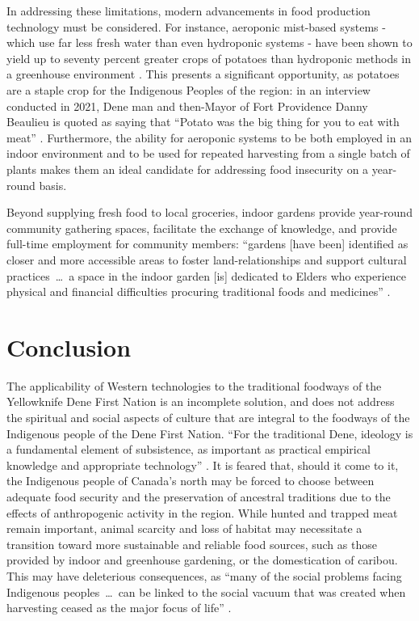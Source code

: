 \documentclass{report}
\begin{document}
\hspace{24pt} In addressing these limitations, modern advancements in food production technology must be considered. For instance, aeroponic mist-based systems - which use far less fresh water than even hydroponic systems - have been shown to yield up to seventy percent greater crops of potatoes than hydroponic methods in a greenhouse environment \parencite{aeroponicpotatoes}. This presents a significant opportunity, as potatoes are a staple crop for the Indigenous Peoples of the region: in an interview conducted in 2021, Dene man and then-Mayor of Fort Providence Danny Beaulieu is quoted as saying that ``Potato was the big thing for you to eat with meat'' \parencite[91]{resilientcommunities}. Furthermore, the ability for aeroponic systems to be both employed in an indoor environment and to be used for repeated harvesting from a single batch of plants makes them an ideal candidate for addressing food insecurity on a year-round basis.

\hspace{24pt} Beyond supplying fresh food to local groceries, indoor gardens provide year-round community gathering spaces, facilitate the exchange of knowledge, and provide full-time employment for community members: ``gardens [have been] identified as closer and more accessible areas to foster land-relationships and support cultural practices~\ldots~a space in the indoor garden [is] dedicated to Elders who experience physical and financial difficulties procuring traditional foods and medicines'' \parencite[99]{resilientcommunities}. 


\section{Conclusion}

\hspace{24pt} The applicability of Western technologies to the traditional foodways of the Yellowknife Dene First Nation is an incomplete solution, and does not address the spiritual and social aspects of culture that are integral to the foodways of the Indigenous people of the Dene First Nation.
``For the traditional Dene, ideology is a fundamental element of subsistence, as important as practical empirical knowledge and appropriate technology'' \parencite[64]{lorecapturingtraditional}.
It is feared that, should it come to it, the Indigenous people of Canada's north may be forced to choose between adequate food security and the preservation of ancestral traditions due to the effects of anthropogenic activity in the region.
While hunted and trapped meat remain important, animal scarcity and loss of habitat may necessitate a transition toward more sustainable and reliable food sources, such as those provided by indoor and greenhouse gardening, or the domestication of caribou.
This may have deleterious consequences, as ``many of the social problems facing Indigenous peoples~\ldots~can be linked to the social vacuum that was created when harvesting ceased as the major focus of life'' \parencite[269]{socialculturalcapital}.
\end{document}
